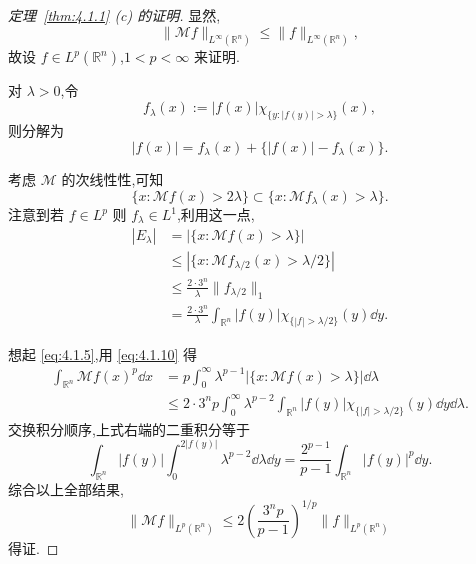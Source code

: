 \begin{proof}[定理~\ref{thm:4.1.1} (c) 的证明]
显然,
\begin{equation}
\|\mathcal{M}f\|_{L^{\infty}(\mathbb{R}^{n})} \leq \|f\|_{L^{\infty}(\mathbb{R}^{n})},\tag{4.1.9}
\label{eq:4.1.9}\end{equation}
故设 $f \in L^{p}(\mathbb{R}^{n})$,$1 < p < \infty$ 来证明.

对 $\lambda > 0$,令
\begin{equation*}
f_{\lambda}(x) := |f(x)|\chi_{\{y: |f(y)| > \lambda\}}(x),
\end{equation*}
则分解为
\begin{equation*}
|f(x)| = f_{\lambda}(x) + \{|f(x)| - f_{\lambda}(x)\}.
\end{equation*}

考虑 $\mathcal{M}$ 的次线性性,可知
\begin{equation*}
\{x: \mathcal{M}f(x) > 2\lambda\} \subset \{x: \mathcal{M}f_{\lambda}(x) > \lambda\}.
\end{equation*}
注意到若 $f \in L^{p}$ 则 $f_{\lambda} \in L^{1}$,利用这一点,
\begin{equation}
\begin{aligned}
|E_{\lambda}| & = |\{x: \mathcal{M}f(x) > \lambda\}| \\
& \leq |\{x: \mathcal{M}f_{\lambda/2}(x) > \lambda/2\}| \\
& \leq \frac{2\cdot 3^{n}}{\lambda}\|f_{\lambda/2}\|_{1} \\
& = \frac{2\cdot 3^{n}}{\lambda}\int_{\mathbb{R}^{n}}|f(y)|\chi_{\{|f| > \lambda/2\}}(y)\dd y.
\end{aligned}\tag{4.1.10}
\label{eq:4.1.10}\end{equation}

想起 \eqref{eq:4.1.5},用 \eqref{eq:4.1.10} 得
\begin{equation}
\begin{aligned}
\int_{\mathbb{R}^{n}}\mathcal{M}f(x)^{p}\dd x & = p\int_{0}^{\infty}\lambda^{p-1}|\{x: \mathcal{M}f(x) > \lambda\}|\dd\lambda \\
& \leq 2\cdot 3^{n}p\int_{0}^{\infty}\lambda^{p-2}\int_{\mathbb{R}^{n}}|f(y)|\chi_{\{|f| > \lambda/2\}}(y)\dd y\dd\lambda.
\end{aligned}
\end{equation}
交换积分顺序,上式右端的二重积分等于
\begin{equation*}
\int_{\mathbb{R}^{n}}|f(y)|\int_{0}^{2|f(y)|}\lambda^{p-2}\dd\lambda\dd y = \frac{2^{p-1}}{p-1}\int_{\mathbb{R}^{n}}|f(y)|^{p}\dd y.
\end{equation*}
综合以上全部结果,
\begin{equation*}
\|\mathcal{M}f\|_{L^{p}(\mathbb{R}^{n})} \leq 2\left(\frac{3^{n}p}{p-1}\right)^{1/p}\|f\|_{L^{p}(\mathbb{R}^{n})}
\end{equation*}
得证.
\end{proof}


